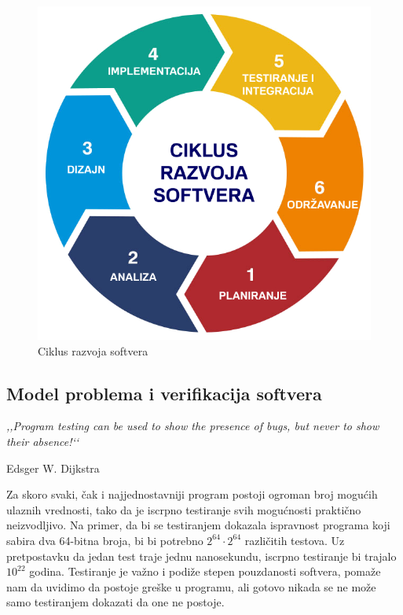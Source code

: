 \documentclass[a4paper]{article}
\begin{document}
\begin{figure}[h!]
\begin{center}
\includegraphics[scale=0.25]{rs.png}
\end{center}
\caption{Ciklus razvoja softvera}
\label{fig:rs}
\end{figure}

\subsection{Model problema i verifikacija softvera}
\label{subsec:ali}
\epigraph{\emph{,,Program testing can be used to show the presence of bugs, but never to show their absence!‘‘}}{Edsger W. Dijkstra}

Za skoro svaki, čak i najjednostavniji program postoji ogroman broj mogućih ulaznih vrednosti, tako da je iscrpno testiranje svih mogućnosti praktično neizvodljivo. Na primer, da bi se testiranjem dokazala ispravnost programa koji sabira dva 64-bitna broja, bi bi potrebno $2^{64} \cdot 2^{64}$ različitih testova. Uz pretpostavku da jedan test traje jednu nanosekundu, iscrpno testiranje bi trajalo $10^{22}$ godina. Testiranje je važno i podiže stepen pouzdanosti softvera, pomaže nam da uvidimo da postoje greške u programu, ali gotovo nikada se ne može samo testiranjem dokazati da one ne postoje.
\end{document}
